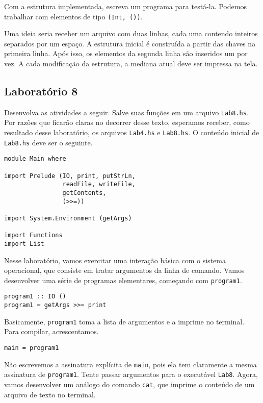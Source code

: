 \documentclass[a4paper]{article}
\begin{document}
Com a estrutura implementada, escreva um programa para testá-la.
Podemos trabalhar com elementos de tipo \texttt{(Int, ())}.

Uma ideia seria receber um arquivo com duas linhas, cada uma contendo inteiros separados por um espaço.
A estrutura inicial é construída a partir das chaves na primeira linha.
Após isso, os elementos da segunda linha são inseridos um por vez.
A cada modificação da estrutura, a mediana atual deve ser impressa na tela.

\subsection{Laboratório 8}

Desenvolva as atividades a seguir.
Salve suas funções em um arquivo \texttt{Lab8.hs}.
Por razões que ficarão claras no decorrer desse texto, esperamos receber, como resultado desse laboratório, os arquivos \texttt{Lab4.hs} e \texttt{Lab8.hs}.
O conteúdo inicial de \texttt{Lab8.hs} deve ser o seguinte.

\pagebreak

\begin{verbatim}
module Main where

import Prelude (IO, print, putStrLn,
                readFile, writeFile,
                getContents,
                (>>=))

import System.Environment (getArgs)

import Functions
import List
\end{verbatim}

Nesse laboratório, vamos exercitar uma interação básica com o sistema operacional, que consiste em tratar argumentos da linha de comando.
Vamos desenvolver uma série de programas elementares, começando com \texttt{program1}.

\begin{verbatim}
program1 :: IO ()
program1 = getArgs >>= print
\end{verbatim}

Basicamente, \texttt{program1} toma a lista de argumentos e a imprime no terminal.
Para compilar, acrescentamos.

\begin{verbatim}
main = program1
\end{verbatim}

Não escrevemos a assinatura explícita de \texttt{main}, pois ela tem claramente a mesma assinatura de \texttt{program1}.
Tente passar argumentos para o executável \texttt{Lab8}.
Agora, vamos desenvolver um análogo do comando \texttt{cat}, que imprime o conteúdo de um arquivo de texto no terminal.
\end{document}
